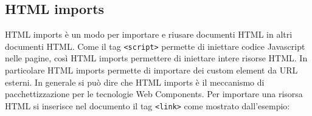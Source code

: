 \subsection{HTML imports}
\label{sec:chapter_tecnologie_abilitanti_html_imports}

HTML imports è un modo per importare e riusare documenti HTML in altri documenti HTML. Come il tag \texttt{<script>} permette di iniettare codice Javascript nelle pagine, così HTML imports permettere di iniettare intere risorse HTML. In particolare HTML imports permette di importare dei custom element da URL esterni. In generale si può dire che HTML imports è il meccanismo di pacchettizzazione per le tecnologie Web Components.
Per importare una risorsa HTML si inserisce nel documento il tag \texttt{<link>} come mostrato dall’esempio:
